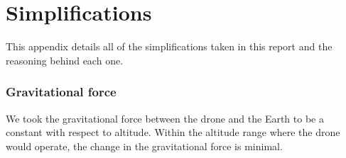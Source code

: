 \section{Simplifications}
This appendix details all of the simplifications taken in this report and the reasoning behind each one.
\begin{subappendices}
\subsubsection{Gravitational force}\label{s:simp g force}
We took the gravitational force between the drone and the Earth to be a constant with respect to altitude. Within the altitude range where the drone would operate, the change in the gravitational force is minimal.

\end{subappendices}